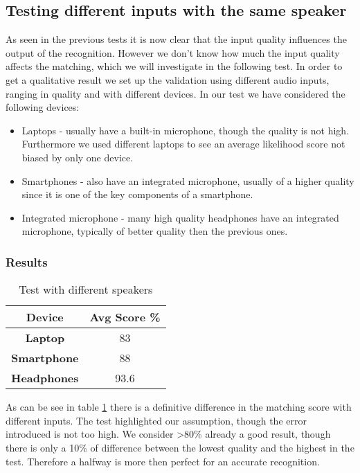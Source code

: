 \subsection{Testing different inputs with the same speaker}

As seen in the previous tests it is now clear that the input quality influences the output
of the recognition. However we don't know how much the input quality affects the matching,
which we will investigate in the following test. In order to get a qualitative result
we set up the validation using different audio inputs, ranging in quality and with different
devices. In our test we have considered the following devices:

\begin{itemize}
    \item Laptops - usually have a built-in microphone, though the quality
    is not high. Furthermore we used different laptops to see an average likelihood
    score not biased by only one device.
    \item Smartphones - also have an integrated microphone, usually of a higher quality
    since it is one of the key components of a smartphone.
    \item Integrated microphone - many high quality headphones have an integrated
    microphone, typically of better quality then the previous ones.
\end{itemize}

\subsubsection{Results}

\begin{table}

\centering
\caption{Test with different speakers}
\label{tab:inputres}
\begin{tabular}{|c|c|} \hline
\textbf{Device} & \textbf{Avg Score \%} \\ \hline
\textbf{Laptop} & 83 \\ \hline
\textbf{Smartphone} & 88  \\ \hline
\textbf{Headphones} & 93.6  \\ \hline
\end{tabular}
\end{table}

As can be see in table \ref{tab:inputres} there is a definitive difference in the matching score
with different inputs. The test highlighted our assumption, though the error introduced is
not too high. We consider \textgreater 80\% already a good result, though there is only a 10\%
of difference between the lowest quality and the highest in the test. Therefore a halfway
is more then perfect for an accurate recognition.



